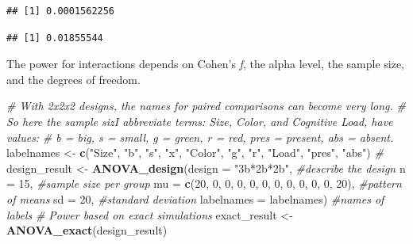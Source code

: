 \documentclass[]{book}
\newenvironment{Shaded}{\begin{snugshade}}{\end{snugshade}}
\newcommand{\CommentTok}[1]{\textcolor[rgb]{0.56,0.35,0.01}{\textit{#1}}}
\newcommand{\DataTypeTok}[1]{\textcolor[rgb]{0.13,0.29,0.53}{#1}}
\newcommand{\DecValTok}[1]{\textcolor[rgb]{0.00,0.00,0.81}{#1}}
\newcommand{\KeywordTok}[1]{\textcolor[rgb]{0.13,0.29,0.53}{\textbf{#1}}}
\newcommand{\NormalTok}[1]{#1}
\newcommand{\OperatorTok}[1]{\textcolor[rgb]{0.81,0.36,0.00}{\textbf{#1}}}
\newcommand{\StringTok}[1]{\textcolor[rgb]{0.31,0.60,0.02}{#1}}
\begin{document}
\begin{verbatim}
## [1] 0.0001562256
\end{verbatim}

\begin{Shaded}
\end{Shaded}

\begin{verbatim}
## [1] 0.01855544
\end{verbatim}

The power for interactions depends on Cohen's \emph{f}, the alpha level, the sample size, and the degrees of freedom.

\begin{Shaded}
\begin{Highlighting}[]
\CommentTok{# With 2x2x2 designs, the names for paired comparisons can become very long. }
\CommentTok{# So here the sample sizI abbreviate terms: Size, Color, and Cognitive Load, have values:}
\CommentTok{# b = big, s = small, g = green, r = red, pres = present, abs = absent.  }
\NormalTok{labelnames <-}\StringTok{ }\KeywordTok{c}\NormalTok{(}\StringTok{"Size"}\NormalTok{, }\StringTok{"b"}\NormalTok{, }\StringTok{"s"}\NormalTok{, }\StringTok{"x"}\NormalTok{, }\StringTok{"Color"}\NormalTok{, }\StringTok{"g"}\NormalTok{, }\StringTok{"r"}\NormalTok{, }
                \StringTok{"Load"}\NormalTok{, }\StringTok{"pres"}\NormalTok{, }\StringTok{"abs"}\NormalTok{) }\CommentTok{#}
\NormalTok{design_result <-}\StringTok{ }\KeywordTok{ANOVA_design}\NormalTok{(}\DataTypeTok{design =} \StringTok{"3b*2b*2b"}\NormalTok{, }\CommentTok{#describe the design}
                              \DataTypeTok{n =} \DecValTok{15}\NormalTok{, }\CommentTok{#sample size per group }
                              \DataTypeTok{mu =} \KeywordTok{c}\NormalTok{(}\DecValTok{20}\NormalTok{, }\DecValTok{0}\NormalTok{, }\DecValTok{0}\NormalTok{, }\DecValTok{0}\NormalTok{, }\DecValTok{0}\NormalTok{, }\DecValTok{0}\NormalTok{, }\DecValTok{0}\NormalTok{, }\DecValTok{0}\NormalTok{, }\DecValTok{0}\NormalTok{, }\DecValTok{0}\NormalTok{, }\DecValTok{0}\NormalTok{, }\DecValTok{20}\NormalTok{), }\CommentTok{#pattern of means}
                              \DataTypeTok{sd =} \DecValTok{20}\NormalTok{, }\CommentTok{#standard deviation}
                              \DataTypeTok{labelnames =}\NormalTok{ labelnames) }\CommentTok{#names of labels}
\CommentTok{# Power based on exact simulations}
\NormalTok{exact_result <-}\StringTok{ }\KeywordTok{ANOVA_exact}\NormalTok{(design_result)}
\end{Highlighting}
\end{Shaded}
\end{document}
